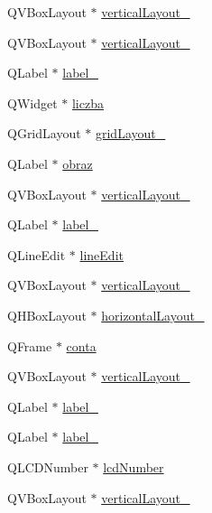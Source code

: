 \begin{DoxyCompactItemize}
Q\+V\+Box\+Layout $\ast$ \hyperlink{class_ui___main_window_ab35de77115e747d4efa5ecde01d9c16a}{vertical\+Layout\+\_}
\item 
Q\+V\+Box\+Layout $\ast$ \hyperlink{class_ui___main_window_afb6bb8ab195766b2b18cee42bcdc246b}{vertical\+Layout\+\_}
\item 
Q\+Label $\ast$ \hyperlink{class_ui___main_window_a2e2516d755e4dd53fc905dabddf2738a}{label\+\_}
\item 
Q\+Widget $\ast$ \hyperlink{class_ui___main_window_a535fef6f202cd531e7b9e8f09e41ef15}{liczba}
\item 
Q\+Grid\+Layout $\ast$ \hyperlink{class_ui___main_window_aa03590dd5aac614bf717649a544c015f}{grid\+Layout\+\_}
\item 
Q\+Label $\ast$ \hyperlink{class_ui___main_window_a695652e0f65074c1e868e5d2851d4881}{obraz}
\item 
Q\+V\+Box\+Layout $\ast$ \hyperlink{class_ui___main_window_ab69a0ed5b8ea1148c5dda9b89cdfbba4}{vertical\+Layout\+\_}
\item 
Q\+Label $\ast$ \hyperlink{class_ui___main_window_a0376fd90247280e7c7957cc70628708c}{label\+\_}
\item 
Q\+Line\+Edit $\ast$ \hyperlink{class_ui___main_window_a7a5b9a4633d64f502ce81da3202d828c}{line\+Edit}
\item 
Q\+V\+Box\+Layout $\ast$ \hyperlink{class_ui___main_window_afb1464f1d82290bdb55ce9c30a62c2c5}{vertical\+Layout\+\_}
\item 
Q\+H\+Box\+Layout $\ast$ \hyperlink{class_ui___main_window_a80867018070156432923d0266cc9fe25}{horizontal\+Layout\+\_}
\item 
Q\+Frame $\ast$ \hyperlink{class_ui___main_window_abd57bc5dce01c52812be6ea62f169761}{conta}
\item 
Q\+V\+Box\+Layout $\ast$ \hyperlink{class_ui___main_window_aaa8cc393d5a44562d629a9f646d2c6dd}{vertical\+Layout\+\_}
\item 
Q\+Label $\ast$ \hyperlink{class_ui___main_window_a78c7e10730b43c6700cd7216911ed76a}{label\+\_}
\item 
Q\+Label $\ast$ \hyperlink{class_ui___main_window_ad6bab8fb8903b8f41afea1218ee52695}{label\+\_}
\item 
Q\+L\+C\+D\+Number $\ast$ \hyperlink{class_ui___main_window_aeaa664b636e02543a3047acb6d8918c5}{lcd\+Number}
\item 
Q\+V\+Box\+Layout $\ast$ \hyperlink{class_ui___main_window_a7b66d5d6ab55f3977317359d09a42345}{vertical\+Layout\+\_}
\item 

\end{DoxyCompactItemize}
